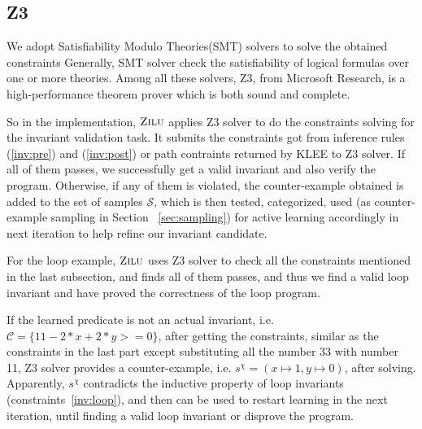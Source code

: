 
\subsection{Z3}
\label{subsec:z3}

We adopt Satisfiability Modulo Theories(SMT) \cite{barrett2009satisfiability} solvers to solve the obtained constraints
Generally, SMT solver check the satisfiability of logical formulas over one or more theories. 
Among all these solvers, Z3\cite{de2008z3}, from Microsoft Research, is a high-performance theorem prover which is both sound and complete.

So in the implementation, $\textsc{Zilu}$ applies Z3 solver to do the constraints solving for the invariant validation task. 
It submits the constraints got from inference rules (\ref{inv:pre}) and (\ref{inv:post}) or path contraints returned by KLEE to Z3 solver.
If all of them passes, we successfully get a valid invariant and also verify the program. 
Otherwise, if any of them is violated, the counter-example obtained is added to the set of samples $\mathcal{S}$, 
which is then tested, categorized, used (as counter-example sampling in Section ~\ref{sec:sampling}) for active learning accordingly 
in next iteration to help refine our invariant candidate.

For the loop example, $\textsc{Zilu}$ uses Z3 solver to check all the constraints mentioned in the last subsection,
and finds all of them passes, and thus we find a valid loop invariant and have proved the correctness of the loop program.

If the learned predicate is not an actual invariant, i.e. $\mathcal{C} = \{11-2*x+2*y>=0\}$,
after getting the constraints, similar as the constraints in the last part except substituting all the number 33 with number 11, 
Z3 solver provides a counter-example, i.e. $s^{\chi} = (x \mapsto 1, y \mapsto 0)$, after solving.
Apparently, $s^{\chi}$ contradicts the inductive property of loop invariants (constraints~\ref{inv:loop}), 
and then can be used to restart learning in the next iteration, until finding a valid loop invariant or disprove the program.





